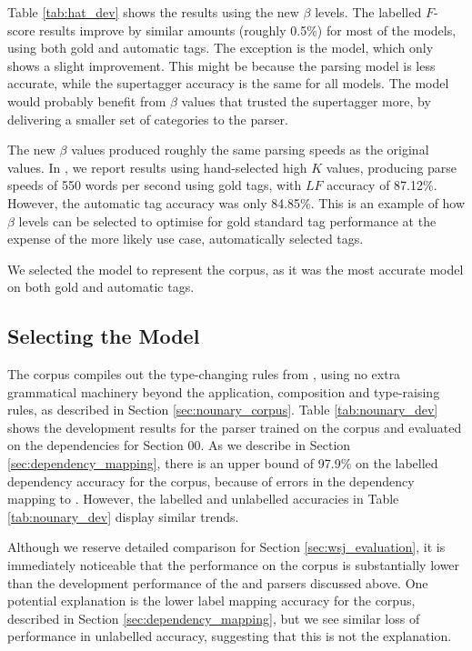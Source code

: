 Table \ref{tab:hat_dev} shows the results using the new $\beta$ levels. The
labelled $F$-score results improve by similar amounts (roughly 0.5\%) for most
of the models, using both gold and automatic \pos tags. The exception is the
\derivsbad model, which only shows a slight improvement. This might be because
the parsing model is less accurate, while the supertagger accuracy is the same
for all models. The \derivsbad model would probably benefit from $\beta$ values
that trusted the supertagger more, by delivering a smaller set of categories to
the parser.

The new $\beta$ values produced roughly the same parsing speeds as the original
values. In \citet{honnibal:09}, we report results using hand-selected high $K$
values, producing parse speeds of 550 words per second using gold \pos tags,
with $LF$ accuracy of 87.12\%. However, the automatic \pos tag accuracy was only
84.85\%. This is an example of how $\beta$ levels can be selected to optimise
for gold standard \pos tag performance at the expense of the more likely use
case, automatically selected \pos tags.

We selected the \hybrid\optbeta model to represent the \hatsys corpus, as it
was the most accurate model on both gold and automatic \pos tags.

\subsection{Selecting the \nounary Model}
\label{sec:nounary_dev}

The \nounary corpus compiles out the type-changing rules from \ccgbank, using
no extra grammatical machinery beyond the application, composition and
type-raising rules, as described in Section \ref{sec:nounary_corpus}. Table
\ref{tab:nounary_dev} shows the development results for the parser trained on
the \nounary corpus and evaluated on the \ccgbank dependencies for Section 00.
As we describe in Section \ref{sec:dependency_mapping}, there is an upper bound
of 97.9\% on the labelled dependency accuracy for the \nounary corpus, because
of errors in the dependency mapping to \ccgbank. However, the labelled and
unlabelled accuracies in Table \ref{tab:nounary_dev} display similar trends.

Although we reserve detailed comparison for Section \ref{sec:wsj_evaluation}, it
is immediately noticeable that the performance on the \nounary corpus is
substantially lower than the development performance of the \ccgbank and \hatsys
parsers discussed above. One potential explanation is the lower label mapping
accuracy for the \nounary corpus, described in Section
\ref{sec:dependency_mapping}, but we see similar loss of performance in
unlabelled accuracy, suggesting that this is not the explanation.

